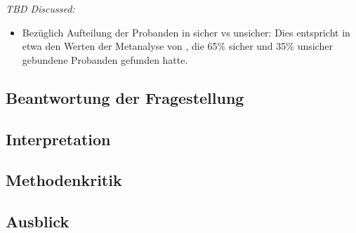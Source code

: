 \textit{TBD Discussed:}
\begin{itemize}
    \item Bezüglich Aufteilung der Probanden in sicher vs unsicher: Dies entspricht in etwa den Werten der Metanalyse von , die 65\% sicher und 35\% unsicher gebundene Probanden gefunden hatte.
\end{itemize}


\subsection{Beantwortung der Fragestellung} \label{sec:BeantwortungFragestellung}

\subsection{Interpretation} \label{sec:Interpretation}

\subsection{Methodenkritik} \label{sec:Methodenkritik}

\subsection{Ausblick} \label{sec:Ausblick}